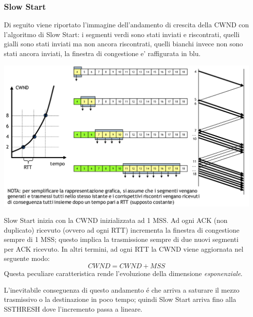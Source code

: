 \documentclass[12pt]{article}
\begin{document}
\clearpage
\subsubsection{Slow Start}\label{tcp-congestione-slow-start}
Di seguito viene riportato l'immagine dell'andamento di crescita della CWND con l'algoritmo di Slow Start: i segmenti 
verdi sono stati inviati e riscontrati, quelli gialli sono stati inviati ma non ancora riscontrati, quelli bianchi 
invece non sono stati ancora inviati, la finestra di congestione e' raffigurata in blu.
\begin{center}
	\includegraphics[scale=0.4]{livello_trasporto-img6.png}
\end{center}
Slow Start inizia con la CWND inizializzata ad 1 MSS. Ad ogni ACK (non duplicato) ricevuto (ovvero ad ogni RTT) 
incrementa la finestra di congestione sempre di 1 MSS; questo implica la trasmissione sempre di due nuovi 
segmenti per ACK ricevuto. In altri termini, ad ogni RTT la CWND viene aggiornata nel seguente modo:
\begin{equation}\label{eq:cwnd-slow-start}
	CWND = CWND + MSS
\end{equation}
Questa peculiare caratteristica rende l'evoluzione della dimensione \textit{esponenziale}.

L'inevitabile conseguenza di questo andamento \'e che arriva a saturare il mezzo trasmissivo o la destinazione in 
poco tempo; quindi Slow Start arriva fino alla SSTHRESH dove l'incremento passa a lineare.

\clearpage
\end{document}
